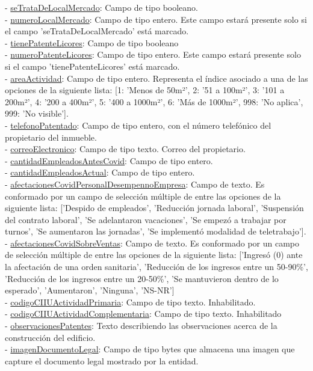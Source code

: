 - \underline{seTrataDeLocalMercado}: Campo de tipo booleano. \\
- \underline{numeroLocalMercado}: Campo de tipo entero. Este campo estará presente solo si el campo 'seTrataDeLocalMercado' está marcado. \\
- \underline{tienePatenteLicores}: Campo de tipo booleano \\
- \underline{numeroPatenteLicores}: Campo de tipo entero. Este campo estará presente solo si el campo 'tienePatenteLicores' está marcado. \\
- \underline{areaActividad}: Campo de tipo entero. Representa el índice asociado a una de las opciones de la siguiente lista: [1: 'Menos de 50m²', 2: '51 a 100m²', 3: '101 a 200m²', 4: '200 a 400m²', 5: '400 a 1000m²', 6: 'Más de 1000m²', 998: 'No aplica', 999: 'No visible']. \\
- \underline{telefonoPatentado}: Campo de tipo entero, con el número telefónico del propietario del inmueble. \\
- \underline{correoElectronico}: Campo de tipo texto. Correo del propietario. \\
- \underline{cantidadEmpleadosAntesCovid}: Campo de tipo entero. \\
- \underline{cantidadEmpleadosActual}: Campo de tipo entero. \\
- \underline{afectacionesCovidPersonalDesempennoEmpresa}: Campo de texto. Es conformado por un campo de selección múltiple de entre las opciones de la siguiente lista: ['Despido de empleados', 'Reducción jornada laboral', 'Suspensión del contrato laboral', 'Se adelantaron vacaciones', 'Se empezó a trabajar por turnos', 'Se aumentaron las jornadas', 'Se implementó modalidad de teletrabajo']. \\
- \underline{afectacionesCovidSobreVentas}: Campo de texto. Es conformado por un campo de selección múltiple de entre las opciones de la siguiente lista: ['Ingresó (0) ante la afectación de una orden sanitaria', 'Reducción de los ingresos entre un 50-90\%', 'Reducción de los ingresos entre un 20-50\%', 'Se mantuvieron dentro de lo esperado', 'Aumentaron', 'Ninguna', 'NS-NR'] \\
- \underline{codigoCIIUActividadPrimaria}: Campo de tipo texto. Inhabilitado. \\
- \underline{codigoCIIUActividadComplementaria}: Campo de tipo texto. Inhabilitado \\
- \underline{observacionesPatentes}: Texto describiendo las observaciones acerca de la construcción del edificio. \\
- \underline{imagenDocumentoLegal}: Campo de tipo bytes que almacena una imagen que capture el documento legal mostrado por la entidad. \\

